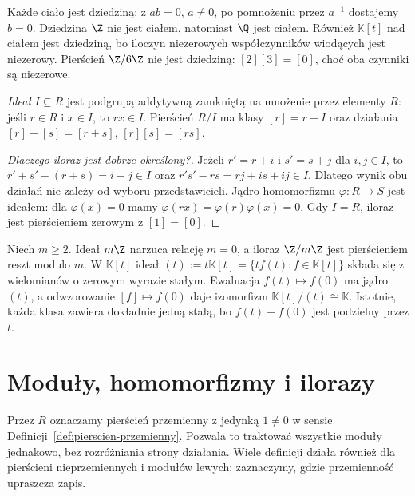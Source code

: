 Każde ciało jest dziedziną: z $ab=0$, $a\ne0$, po pomnożeniu
przez $a^{-1}$ dostajemy $b=0$. Dziedzina $\Z$ nie jest ciałem,
natomiast $\Q$ jest ciałem. Również $\mathbb K[t]$ nad ciałem
jest dziedziną, bo iloczyn niezerowych współczynników wiodących
jest niezerowy. Pierścień $\Z/6\Z$ nie jest dziedziną:
$[2][3]=[0]$, choć oba czynniki są niezerowe.

\begin{definicja}
\label{def:ideal-iloraz}
\emph{Ideał} $I\subseteq R$ jest podgrupą
addytywną zamkniętą na mnożenie przez
elementy $R$: jeśli $r\in R$ i $x\in I$,
to $rx\in I$. Pierścień $R/I$ ma klasy
$[r]=r+I$ oraz działania
$[r]+[s]=[r+s]$, $[r][s]=[rs]$.
\end{definicja}

\begin{proof}[Dlaczego iloraz jest dobrze określony?]
Jeżeli $r'=r+i$ i $s'=s+j$ dla $i,j\in I$,
to $r'+s'-(r+s)=i+j\in I$ oraz
$r's'-rs=rj+is+ij\in I$.
Dlatego wynik obu działań nie zależy od
wyboru przedstawicieli. Jądro homomorfizmu
$\varphi:R\to S$ jest ideałem: dla
$\varphi(x)=0$ mamy
$\varphi(rx)=\varphi(r)\varphi(x)=0$.
Gdy $I=R$, iloraz jest pierścieniem zerowym
z $[1]=[0]$.
\end{proof}

\begin{przyklad}
\label{prz:idealy-ilorazy}
Niech $m\geq2$. Ideał $m\Z$ narzuca
relację $m=0$, a iloraz $\Z/m\Z$ jest pierścieniem
reszt modulo $m$. W $\mathbb K[t]$
ideał $(t):=t\mathbb K[t]=
\{tf(t):f\in\mathbb K[t]\}$ składa się z wielomianów
o zerowym wyrazie stałym. Ewaluacja
$f(t)\mapsto f(0)$ ma jądro $(t)$,
a odwzorowanie $[f]\mapsto f(0)$
daje izomorfizm
$\mathbb K[t]/(t)\cong\mathbb K$.
Istotnie, każda klasa zawiera dokładnie
jedną stałą, bo $f(t)-f(0)$ jest podzielny
przez $t$.
\end{przyklad}

\section{Moduły, homomorfizmy i ilorazy}
\label{sec:moduly}

Przez $R$ oznaczamy pierścień przemienny z jedynką
$1\ne0$ w sensie Definicji~\ref{def:pierscien-przemienny}.
Pozwala to traktować wszystkie moduły
jednakowo, bez rozróżniania strony działania.
Wiele definicji działa również dla pierścieni
nieprzemiennych i modułów lewych; zaznaczymy,
gdzie przemienność upraszcza zapis.

